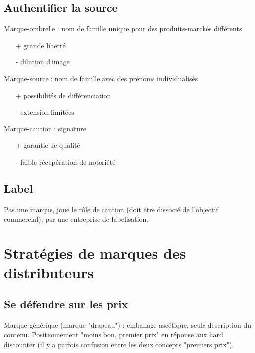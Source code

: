 		\subsection{Authentifier la source}
		
		
		Marque-ombrelle : nom de famille unique pour des produits-marchés différents
		
		\begin{itemize}
			\item[+] grande liberté
			\item[-] dilution d'image
		\end{itemize}
		
		Marque-source : nom de famille avec des prénoms individualisés
		
		\begin{itemize}
			\item[+] possibilités de différenciation
			\item[-] extension limitées
		\end{itemize}
		
		
		Marque-caution : signature
		
		\begin{itemize}
			\item[+] garantie de qualité
			\item[-] faible récupération de notoriété
		\end{itemize}
		
		
		\subsection{Label}
		
		Pas une marque, joue le rôle de caution (doit être dissocié de l'objectif commercial), par une entreprise de labelisation.
		
		
	\section{Stratégies de marques des distributeurs}
	
		\subsection{Se défendre sur les prix}
		
		Marque générique (marque "drapeau") : emballage ascétique, seule description du contenu. Positionnement "moins bon, premier prix" en réponse aux hard discounter (il y a parfois confusion entre les deux concepts "premiers prix").
		
